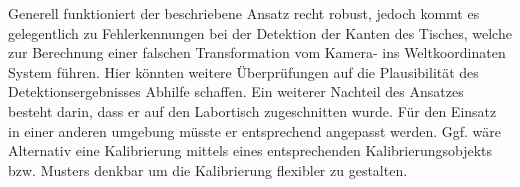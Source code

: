 Generell funktioniert der beschriebene Ansatz recht robust, jedoch kommt es gelegentlich zu Fehlerkennungen bei der Detektion der Kanten des Tisches, welche zur Berechnung einer falschen Transformation vom Kamera- ins Weltkoordinaten System führen. Hier könnten weitere Überprüfungen auf die Plausibilität des Detektionsergebnisses Abhilfe schaffen.
Ein weiterer Nachteil des Ansatzes besteht darin, dass er auf den Labortisch zugeschnitten wurde. Für den Einsatz in einer anderen umgebung müsste er entsprechend angepasst werden. Ggf. wäre Alternativ eine Kalibrierung mittels eines entsprechenden Kalibrierungsobjekts bzw. Musters denkbar um die Kalibrierung flexibler zu gestalten.